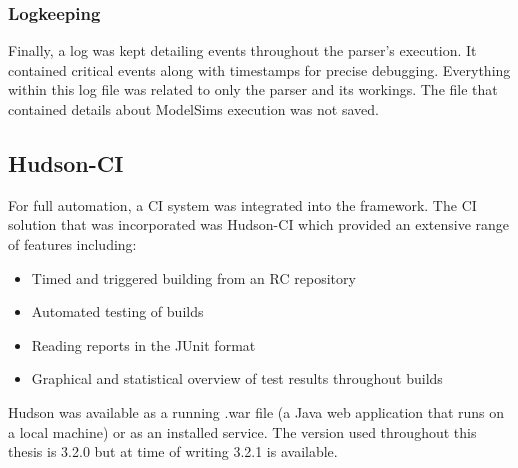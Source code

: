 \documentclass[11pt,british]{article}
\begin{document}
\subsubsection{Logkeeping}
Finally, a log was kept detailing events throughout the parser's execution. It contained critical events along with timestamps for precise debugging. Everything within this log file was related to only the parser and its workings. The file that contained details about ModelSims execution was not saved.

\subsection{Hudson-CI}
\label{subsec:Hudson}
For full automation, a \gls{CI} system was integrated into the framework. The \gls{CI} solution that was incorporated was Hudson-CI which provided an extensive range of features including:
\begin{itemize}%
\item Timed and triggered building from an \gls{RC} repository
\item Automated testing of builds
\item Reading reports in the JUnit format
\item Graphical and statistical overview of test results throughout builds
\end{itemize}
Hudson was available as a running .war file (a Java web application that runs on a local machine) or as an installed service.\cite{hudson} The version used throughout this thesis is 3.2.0 but at time of writing 3.2.1 is available.
\end{document}
